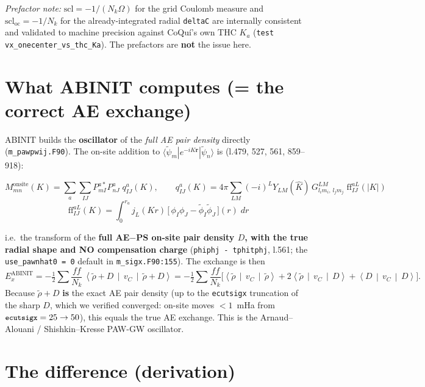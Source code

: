 \documentclass[11pt]{article}
\newcommand{\rt}{\tilde{\rho}}
\newcommand{\vc}{v_C}
\newcommand{\avg}[3]{\left\langle #1 \,\middle|\, #2 \,\middle|\, #3 \right\rangle}
\newcommand{\code}[1]{\texttt{\small #1}}
\begin{document}
\emph{Prefactor note:} $\mathrm{scl}=-1/(N_k\Omega)$ for the grid Coulomb measure and
$\mathrm{scl_{oc}}=-1/N_k$ for the already-integrated radial \code{deltaC} are
internally consistent and validated to machine precision against CoQu\'i's own THC
$K_a$ (\code{test vx\_onecenter\_vs\_thc\_Ka}). The prefactors are \textbf{not} the
issue here.

\section{What ABINIT computes (= the correct AE exchange)}

ABINIT builds the \textbf{oscillator} of the \emph{full AE pair density} directly
(\code{m\_pawpwij.F90}). The on-site addition to
$\langle\tilde\psi_m|e^{-iK\mathbf r}|\tilde\psi_n\rangle$ is (l.479, 527, 561, 859--918):
\begin{keybox}
\vspace{-2pt}
\begin{equation}
M^{\text{onsite}}_{mn}(K) = \sum_a\sum_{IJ} P^{a*}_{mI}P^{a}_{nJ}\;
   q^{a}_{IJ}(K),\qquad
q^{a}_{IJ}(K) = 4\pi\sum_{LM}(-i)^{L} Y_{LM}(\hat K)\,
   G^{LM}_{l_i m_i,\,l_j m_j}\; \mathrm{ff}^{aL}_{IJ}(|K|)
\end{equation}
\vspace{-10pt}
\begin{equation}
\mathrm{ff}^{aL}_{IJ}(K) = \int_0^{r_a} j_L(Kr)\,
   \big[\,\phi_I\phi_J - \tilde\phi_I\tilde\phi_J\,\big](r)\; dr
\end{equation}
\vspace{-8pt}
\end{keybox}
i.e.\ the transform of the \textbf{full AE$-$PS on-site pair density $D$, with the
true radial shape and NO compensation charge} (\code{phiphj - tphitphj}, l.561; the
\code{use\_pawnhat0 = 0} default in \code{m\_sigx.F90:155}). The exchange is then
\begin{equation}
E^{\text{ABINIT}}_x = -\tfrac12\sum \frac{f f}{N_k}\,
   \avg{\rt + D}{\vc}{\rt + D}
 = -\tfrac12\sum \frac{f f}{N_k}\Big[
   \avg{\rt}{\vc}{\rt} + 2\avg{\rt}{\vc}{D} + \avg{D}{\vc}{D} \Big].
\end{equation}
Because $\rt + D$ \textbf{is} the exact AE pair density (up to the \code{ecutsigx}
truncation of the sharp $D$, which we verified converged: on-site moves $<1$~mHa
from $\code{ecutsigx}=25\to50$), this equals the true AE exchange. This is the
Arnaud--Alouani / Shishkin--Kresse PAW-GW oscillator.

\section{The difference (derivation)}
\end{document}
